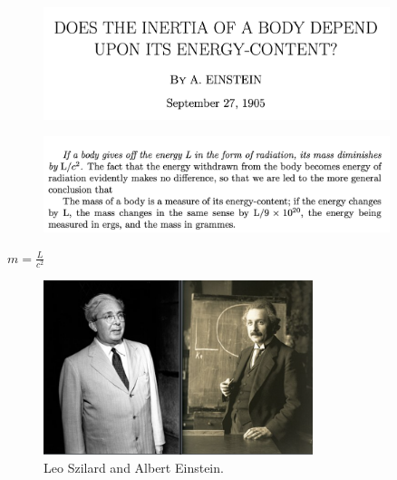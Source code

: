 \documentclass{loyola-beamer}
\begin{document}
\begin{frame}
	\begin{figure}
		\begin{center}
			\includegraphics[width=0.9\textwidth]{./figures/einstein_paper.png}
		\end{center}
	\end{figure}
\end{frame}

\begin{frame}
	\begin{figure}
		\begin{center}
			\includegraphics[width=0.9\textwidth]{./figures/einstein_paper_eq.png}
		\end{center}
	\end{figure}

	\begin{math}
		m = \frac{L}{c^2}
	\end{math}
	
\end{frame}

\begin{frame}
	\begin{center}
	\end{center}
\end{frame}

\begin{frame}
	\begin{figure}
		\begin{center}
			\includegraphics[width=0.7\textwidth]{./figures/leo-and-albert.png}
		\end{center}
		\caption{Leo Szilard and Albert Einstein.}\label{fig:leo and albert}
	\end{figure}
\end{frame}
\end{document}
